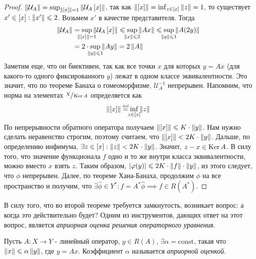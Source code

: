 \begin{proof}
    $\left\|\mathcal{U}_A\right\| = \sup_{\left\|\left[x \right]\right\| = 1} \left\|\mathcal{U}_A\left[x \right]\right\|$,
    так как $\left\|\left[x \right]\right\| = \inf_{z \in \left[x \right]} \left\|z\right\| = 1$,
    то существует $x' \in \left[x \right] : \left\|x'\right\| \leqslant 2$.
    Возьмем $x'$ в качестве представителя. Тогда
    \begin{equation}
        \begin{split}
            \norm{\mathcal{U}_A} & =
            \sup_{\mathclap{\norm{\eqcls{x}} = 1}} \norm{\mathcal{U}_A\eqcls{x}}
            \leqslant \sup_{\mathclap{\norm{x} \leqslant 2}} \norm{Ax}
            \leqslant \sup_{\mathclap{\norm{y} \leqslant 1}} \norm{A(2y)} \\
            & = 2 \cdot \sup_{\mathclap{\norm{y} \leqslant 1}} \norm{Ay}
            = 2 \norm{A}
        \end{split}
    \end{equation}
    Заметим еще, что он биективен, так как все точки $x$ для которых $y = Ax$
    (для какого-то одного фиксированного $y$) лежат в одном классе эквивалентности.
    Это значит, что по теореме Банаха о гомеоморфизме, $\mathcal{U}_A^{-1}$ непрерывен.
    Напомним, что норма на элементах $\sfrac{X}{\operatorname{Ker} A}$ определяется как
    \begin{gather}
        \norm{\eqcls{x}} \defeq \inf_{\mathclap{z \in \eqcls{x}}} \norm{z}
    \end{gather}
    По непрерывности обратного оператора получаем $\left\|\left[x \right]\right\| \leqslant K \cdot \left\|y\right\|$.
    Нам нужно сделать неравенство строгим, поэтому считаем, что
    $\left\|\left[x \right]\right\| < 2K \cdot \left\|y\right\|$. Дальше, по определению инфимума,
    $\exists z \in \left[x \right] : \left\|z\right\| < 2K \cdot \left\|y\right\|$. Значит, $z - x \in \operatorname{Ker} A$.
    В силу того, что значение функционала $f$ одно и то же внутри класса эквивалентности,
    можно вместо $x$ взять $z$. Таким образом,
    $\left|\varphi(y)\right| \leqslant 2K \cdot \left\|f\right\| \cdot \left\|y\right\|$, из этого следует, что
    $\phi$ непрерывен.
    Далее, по теореме Хана-Банаха, продолжим $\phi$ на все пространство и получим, что
    $\exists \widehat{\phi} \in Y^* : f = A^*\widehat{\phi} \implies f \in R(A^*)$.
\end{proof}

В силу того, что во второй теореме требуется замкнутость, 
возникает вопрос: а когда это действительно будет?
Одним из инструментов, дающих ответ на этот вопрос, является
\textit{априорная оценка решения операторного уравнения}.

\begin{definition}
    Пусть $A : X \rightarrow Y$ - линейный оператор, 
    $y \in R(A)$, $\exists \alpha=\text{const}$, 
    такая что $\left\|x\right\| \leqslant \alpha \left\|y\right\|$,
    где $y = Ax$.
    Коэффициент $\alpha$ называется \textit{априорной оценкой}.
\end{definition}


